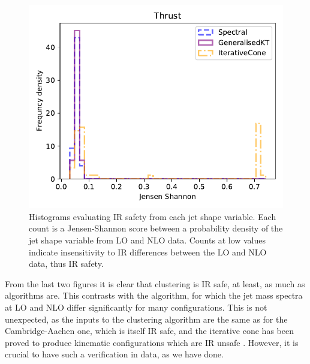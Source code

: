 \begin{figure}[htp]
\begin{minipage}[c]{0.5\textwidth}
        \includegraphics[width=1.\textwidth]{graphics/js_scores/thrust}
    \end{minipage}\hfill
    \begin{minipage}[c]{0.5\textwidth}
    \caption{
        Histograms evaluating IR safety from each jet shape variable.
        Each count is a  Jensen-Shannon score between a probability density of the
        jet shape variable from LO and NLO data.
        Counts at low values indicate insensitivity to IR differences between the LO and NLO data,
        thus IR safety.
     }\label{fig:unnormedJS}
    \end{minipage}
\end{figure}    


From  the last two figures it is clear that \spectral{} clustering  is IR safe, at least, as much as \genkt{} algorithms are.
This contrasts with the \itercone{} algorithm, for which the jet mass spectra at LO and NLO 
differ significantly for many configurations.
This is not unexpected, as the inputs to the \spectral{} clustering algorithm 
are the same as for the Cambridge-Aachen one, 
which is itself IR safe, and the iterative cone has been  proved to produce kinematic configurations which are IR unsafe \cite{Salam:2007xv}.
However, it is crucial to have such a verification in data, as we have done.


